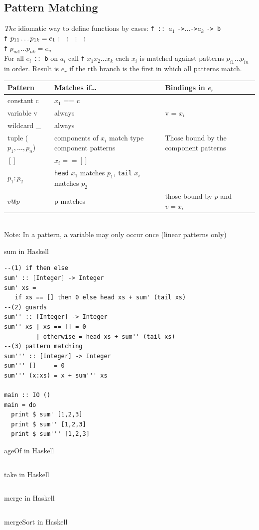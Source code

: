 \documentclass{article}
\newcommand{\Haskell}[1]{\texttt{#1}}
\begin{document}
\subsection{Pattern Matching}
\emph{The} idiomatic way to define functions by cases:
\Haskell{f :: }$a_1$ \Haskell{->}$\ldots$\Haskell{->}$a_k$ \Haskell{-> b}\\
\Haskell{f} $p_{11} \ldots p_{1k} = e_1\\$
$\vdots\quad \vdots\quad \vdots\quad \vdots $\\
\Haskell{f} $p_{m1} \ldots p_{nk} = e_n$\\
For all $e_i$ \Haskell{:: b}
on $a_i$ call \Haskell{f} $x_1x_2\ldots x_k$ each $x_i$ is matched against patterns $p_{i1}\ldots p_{in}$ in order. Result is $e_r$ if the rth branch is the first in which all patterns match.\\
\begin{tabular}{lp{4cm}p{4cm}}
Pattern&Matches if\ldots&Bindings in $e_r$\\\hline
constant c&$x_1$ == c\\
variable v&always& v = $x_i$\\
wildcard \_ &always\\
tuple ($p_1,\ldots,p_n$)&components of $x_i$ match type component patterns& Those bound by the component patterns\\
$[]$& $x_i == []$\\
$p_1:p_2$&\Haskell{head} $x_1$ matches $p_1$, \Haskell{tail} $x_i$ matches $p_2$\\
$v@p$& p matches&those bound by $p$ and $v=x_i$
\end{tabular}\\
Note: In a pattern, a variable may only occur once (linear patterns only)
\begin{listing}
\caption{sum in Haskell}
\begin{verbatim}
--(1) if then else
sum' :: [Integer] -> Integer
sum' xs =
   if xs == [] then 0 else head xs + sum' (tail xs)
--(2) guards
sum'' :: [Integer] -> Integer
sum'' xs | xs == [] = 0
         | otherwise = head xs + sum'' (tail xs)
--(3) pattern matching
sum''' :: [Integer] -> Integer
sum''' []     = 0
sum''' (x:xs) = x + sum''' xs

main :: IO ()
main = do
  print $ sum' [1,2,3]
  print $ sum'' [1,2,3]
  print $ sum''' [1,2,3]
\end{verbatim}
\end{listing}
\begin{listing}\label{ageof.hs}
\caption{ageOf in Haskell}
\inputminted{Haskell}{ageOf.hs}
\end{listing}
\begin{listing}
\caption{take in Haskell}
\inputminted{Haskell}{take.hs}
\end{listing}
\begin{listing}
\caption{merge in Haskell}
\inputminted[]{Haskell}{merges.hs}
\end{listing}
\begin{listing}
\caption{mergeSort in Haskell}
\inputminted{Haskell}{mergesort.hs}
\end{listing}
\end{document}
